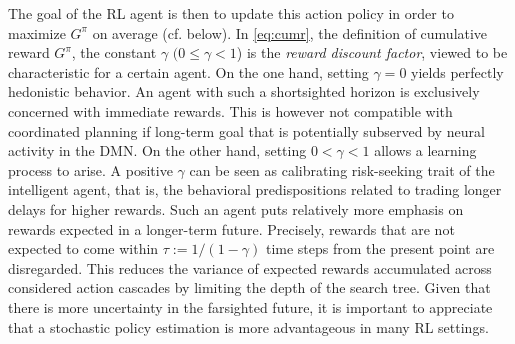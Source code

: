 \documentclass[10pt,letterpaper]{article}
\begin{document}
The goal of the RL agent is then to update this action policy in order
to maximize $G^\pi$ on average (cf. below). In \eqref{eq:cumr},
the definition of cumulative reward $G^\pi$,
the constant $\gamma$ $(0 \le \gamma < 1$) is the \textit{reward discount factor},
viewed to be characteristic for a certain agent.
On the one hand,
setting $\gamma = 0$ yields perfectly hedonistic behavior.
An agent with such a shortsighted horizon is exclusively
concerned with immediate rewards.
This is however not compatible with coordinated planning if long-term goal that is
potentially subserved by neural activity in the DMN.
On the other hand,
setting $0 < \gamma < 1$ allows a learning process to arise.
A positive $\gamma$ can be seen as calibrating risk-seeking trait of the intelligent agent,
that is, the behavioral predispositions related to trading longer delays for higher rewards.
Such an agent puts relatively more emphasis on rewards expected in
a longer-term future. 
Precisely, rewards that are not expected to come within $\tau := 1/(1 - \gamma)$ time steps from the present point are disregarded.
This reduces the variance of expected rewards accumulated across
considered action cascades by limiting the depth of the search tree.
Given that there is more uncertainty in the farsighted future,
it is important to appreciate that a stochastic policy estimation
is more advantageous in many RL settings.
\end{document}
